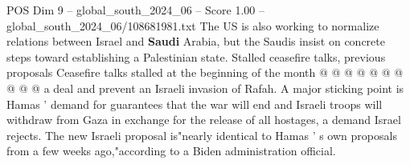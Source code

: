 \begin{textsample}{POS Dim 9 – global\_south\_2024\_06 – Score 1.00 – global\_south\_2024\_06/108681981.txt}
The US is also working to normalize relations between Israel and \textbf{Saudi} Arabia, but the Saudis insist on concrete steps toward establishing a Palestinian state.
Stalled ceasefire talks, previous proposals Ceasefire talks stalled at the beginning of the month @ @ @ @ @ @ @ @ @ @ a deal and prevent an Israeli invasion of Rafah.
A major sticking point is Hamas ' demand for guarantees that the war will end and Israeli troops will withdraw from Gaza in exchange for the release of all hostages, a demand Israel rejects.
The new Israeli proposal is"nearly identical to Hamas ' s own proposals from a few weeks ago,"according to a Biden administration official.

\end{textsample}
